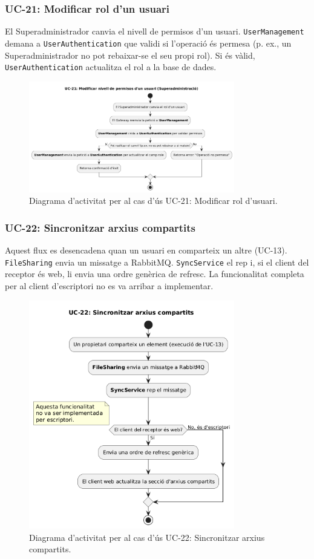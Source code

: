 \subsubsection{UC-21: Modificar rol d'un usuari}
El Superadministrador canvia el nivell de permisos d'un usuari. \texttt{UserManagement} demana a \texttt{UserAuthentication} que validi si l'operació és permesa (p. ex., un Superadministrador no pot rebaixar-se el seu propi rol). Si és vàlid, \texttt{UserAuthentication} actualitza el rol a la base de dades.

\begin{figure}[H]
    \centering
    \includegraphics[width=0.8\textwidth]{Figures/ad_UC21.png}
    \caption{Diagrama d'activitat per al cas d'ús UC-21: Modificar rol d'usuari.}
    \label{fig:ad_uc21_app}
\end{figure}

\subsubsection{UC-22: Sincronitzar arxius compartits}
Aquest flux es desencadena quan un usuari en comparteix un altre (UC-13). \texttt{FileSharing} envia un missatge a RabbitMQ. \texttt{SyncService} el rep i, si el client del receptor és web, li envia una ordre genèrica de refresc. La funcionalitat completa per al client d'escriptori no es va arribar a implementar.

\begin{figure}[H]
    \centering
    \includegraphics[width=0.8\textwidth]{Figures/ad_UC22.png}
    \caption{Diagrama d'activitat per al cas d'ús UC-22: Sincronitzar arxius compartits.}
    \label{fig:ad_uc22_app}
\end{figure} 